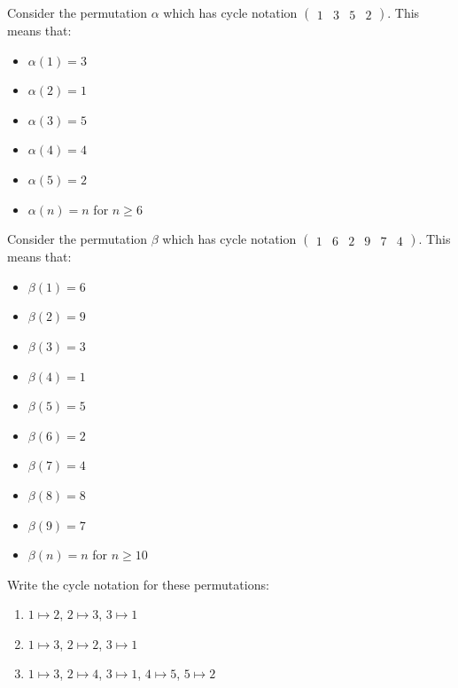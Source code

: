 \begin{example}
    Consider the permutation $\alpha$ which has cycle notation $\begin{pmatrix}1 & 3 & 5 & 2\end{pmatrix}$. This means that:
    \begin{itemize}
        \item $\alpha(1) = 3$
        \item $\alpha(2) = 1$
        \item $\alpha(3) = 5$
        \item $\alpha(4) = 4$
        \item $\alpha(5) = 2$
        \item $\alpha(n) = n$ for $n \geq 6$
    \end{itemize}
\end{example}

\begin{example}
    Consider the permutation $\beta$ which has cycle notation $\begin{pmatrix}1 & 6 & 2 & 9 & 7 & 4\end{pmatrix}$. This means that:
    \begin{itemize}
        \item $\beta(1) = 6$
        \item $\beta(2) = 9$
        \item $\beta(3) = 3$
        \item $\beta(4) = 1$
        \item $\beta(5) = 5$
        \item $\beta(6) = 2$
        \item $\beta(7) = 4$
        \item $\beta(8) = 8$
        \item $\beta(9) = 7$
        \item $\beta(n) = n$ for $n \geq 10$
    \end{itemize}
\end{example}

\begin{exercise}
    Write the cycle notation for these permutations:
    \begin{enumerate}[label=(\alph*)]
        \item $1 \mapsto 2$, $2 \mapsto 3$, $3 \mapsto 1$
        \item $1 \mapsto 3$, $2 \mapsto 2$, $3 \mapsto 1$
        \item $1 \mapsto 3$, $2 \mapsto 4$, $3 \mapsto 1$, $4 \mapsto 5$, $5 \mapsto 2$
    \end{enumerate}
\end{exercise}

